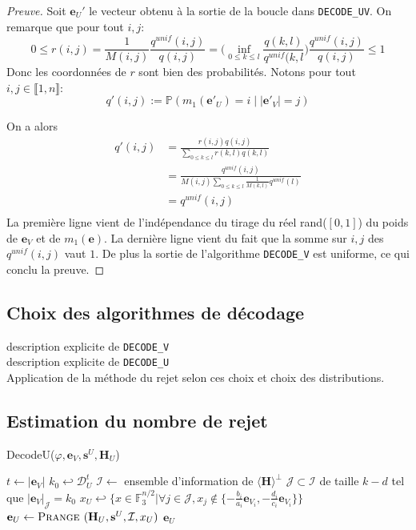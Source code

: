 \documentclass[12pt]{article}
\theoremstyle{plain}
\newcommand{\F}{\mathbb{F}}
\newcommand{\e}{\mathbf{e}}
\newcommand{\s}{\mathbf{s}}
\newcommand{\J}{\mathcal{J}}
\begin{document}
\begin{proof}[Preuve]
Soit $\e_U'$ le vecteur obtenu à la sortie de la boucle dans \verb|DECODE_UV|. On remarque que pour tout $i,j$:
$$0 \leq r(i,j) = \frac{1}{M(i,j)}\frac{q^{unif}(i,j)}{q(i,j)} = \Bigg(\inf_{0 \leq k \leq l}\frac{q(k,l)}{q^{unif}(k,l}\Bigg)\frac{q^{unif}(i,j)}{q(i,j)} \leq 1$$
Donc les coordonnées de $r$ sont bien des probabilités. Notons pour tout $i,j \in \llbracket 1,n \rrbracket$:
$$q'(i,j) := \mathbb{P}(m_1(\mathbf{e'}_U)=i\;|\;|\mathbf{e'}_V|=j)$$

On a alors 
\begin{equation}
\begin{aligned}
q'(i,j) &= \frac{r(i,j)q(i,j)}{\sum_{0 \leq k \leq l}r(k,l)q(k,l)} \\
 &= \frac{q^{unif}(i,j)}{M(i,j)\sum_{0 \leq k \leq l}\frac{1}{M(k,l)}q^{unif}(l)} \\
 &= q^{unif}(i,j) \\
\end{aligned}
\end{equation}
La première ligne vient de l'indépendance du tirage du réel rand($[0,1]$) du poids de $\e_V$ et de $m_1(\e)$. La dernière ligne vient du fait que la somme sur $i,j$ des $q^{unif}(i,j)$ vaut $1$. De plus la sortie de l'algorithme \verb|DECODE_V| est uniforme, ce qui conclu la preuve.
\end{proof}

\subsection{Choix des algorithmes de décodage}
description explicite de \verb|DECODE_V| \\
description explicite de \verb|DECODE_U| \\
Application de la méthode du rejet selon ces choix et choix des distributions. 

\subsection{Estimation du nombre de rejet}


\begin{algorithm}
	\caption{DecodeU($\varphi, \e_V, \s^U, \mathbf{H}_U$)}
	\begin{algorithmic}[1]
		\STATE $t \leftarrow |\e_V|$
		\STATE $k_0 \hookleftarrow \mathcal{D}_U^t$
		\REPEAT
		\STATE $\mathcal{I} \leftarrow$ ensemble d'information de $\langle\mathbf{H}\rangle^\perp$
		\STATE $\mathcal{J} \subset \mathcal{I}$ de taille $k-d$ tel que $|\e_V|_\mathcal{J} = k_0$
		\STATE $x_U \hookleftarrow \{x\in\F_3^{n/2} | \forall j\in\J,  x_j \notin \{-\frac{b_i}{a_i}\e_{V_i}, -\frac{d_i}{c_i}\e_{V_i}\}\}$
		\STATE $\e_U \leftarrow \textsc{Prange }(\mathbf{H}_U, \s^U, \mathcal{I}, x_U)$
		\UNTIL {$|\varphi(\e_U,\e_V)| \neq \omega$}
		\RETURN $\e_U$
    \end{algorithmic}
\end{algorithm}
\end{document}

